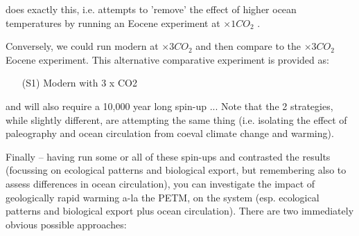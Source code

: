 \documentclass[11pt,fleqn]{book} %
\begin{document}
\noindent does exactly this, i.e. attempts to 'remove' the effect of higher ocean temperatures by running an Eocene experiment at \(\times1 CO_{2}\) .

Conversely, we could run modern at \(\times3 CO_{2}\) and then compare to the \(\times3 CO_{2}\) Eocene experiment. This alternative comparative experiment is provided as:

\vspace{1mm}
\begin{itemize}[noitemsep]
\item[(S1)] \textsf{\footnotesize Modern with 3 x CO2}
\end{itemize}
\vspace{1mm}

\noindent and will also require a 10,000 year long spin-up ... Note that the 2 strategies, while slightly different, are attempting the same thing (i.e. isolating the effect of paleography and ocean circulation from coeval climate change and warming).

Finally -- having run some or all of these spin-ups and contrasted the results (focussing on ecological patterns and biological export, but remembering also to assess differences in ocean circulation), you can investigate the impact of geologically rapid warming a-la the PETM, on the system (esp. ecological patterns and biological export plus ocean circulation). There are two immediately obvious possible approaches:
\end{document}
